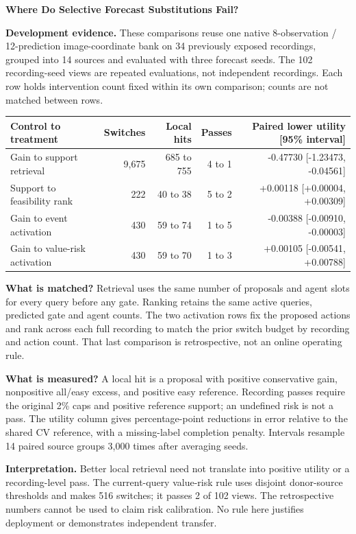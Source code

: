\documentclass[10pt,letterpaper]{article}
\begin{document}
{\Large\bfseries Where Do Selective Forecast Substitutions Fail?}

\textbf{Development evidence.} These comparisons reuse one native
8-observation / 12-prediction image-coordinate bank on 34 previously exposed
recordings, grouped into 14 sources and evaluated with three forecast seeds.
The 102 recording-seed views are repeated evaluations, not independent
recordings. Each row holds intervention count fixed within its own comparison;
counts are not matched between rows.

\begin{center}
\small
\begin{tabular}{@{}lrrrr@{}}
\toprule
Control to treatment & Switches & Local hits & Passes & Paired lower utility [95\% interval] \\
\midrule
Gain to support retrieval & 9,675 & 685 to 755 & 4 to 1 & -0.47730 [-1.23473, -0.04561] \\
Support to feasibility rank & 222 & 40 to 38 & 5 to 2 & +0.00118 [+0.00004, +0.00309] \\
Gain to event activation & 430 & 59 to 74 & 1 to 5 & -0.00388 [-0.00910, -0.00003] \\
Gain to value-risk activation & 430 & 59 to 70 & 1 to 3 & +0.00105 [-0.00541, +0.00788] \\
\bottomrule
\end{tabular}
\end{center}

\textbf{What is matched?}
Retrieval uses the same number of proposals and agent slots for every query
before any gate. Ranking retains the same active queries, predicted gate and
agent counts. The two activation rows fix the proposed actions and rank across
each full recording to match the prior switch budget by recording and action
count. That last comparison is retrospective, not an online operating rule.

\textbf{What is measured?}
A local hit is a proposal with positive conservative gain, nonpositive
all/easy excess, and positive easy reference. Recording passes require
the original 2\% caps and positive reference support; an undefined risk
is not a pass. The utility column gives percentage-point reductions in
error relative to the shared CV reference, with a missing-label
completion penalty. Intervals resample 14 paired source groups 3,000
times after averaging seeds.

\textbf{Interpretation.}
Better local retrieval need not translate into positive utility or a
recording-level pass. The current-query value-risk rule uses disjoint
donor-source thresholds and makes 516 switches; it passes 2 of 102 views.
The retrospective numbers cannot be used to claim risk calibration.
No rule here justifies deployment or demonstrates independent transfer.
\end{document}
